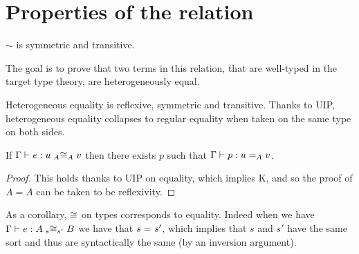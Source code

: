 \section{Properties of the relation}

\begin{lemma}
  $\sim$ is symmetric and transitive.
\end{lemma}


The goal is to prove that two terms in this relation, that are well-typed in the
target type theory, are heterogeneously equal.

Heterogeneous equality is reflexive, symmetric and transitive.
Thanks to \acrshort{UIP}, heterogeneous equality collapses to regular equality
when taken on the same type on both sides.

\begin{lemma}
  If $\isterm{\Ga}{e}{\Heq{A}{u}{A}{v}}$
  then there exists $p$ such that $\isterm{\Ga}{p}{\Eq{A}{u}{v}}$.
\end{lemma}

\begin{proof}
  This holds thanks to \acrshort{UIP} on equality, which implies K, and so the
  proof of $A = A$ can be taken to be reflexivity.
\end{proof}

\begin{remark}
  As a corollary, $\Heqs$ on types corresponds to equality.
  Indeed when we have $\isterm{\Ga}{e}{\Heq{s}{A}{s'}{B}}$ we have
  that $\Eq{}{s}{s'}$, which implies that $s$ and $s'$ have the same sort
  and thus are syntactically the same (by an inversion argument).
\end{remark}

